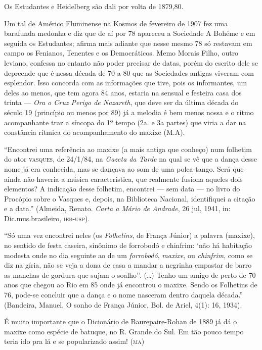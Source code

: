 Os Estudantes e Heidelberg são dali por volta de 1879,80.

Um tal de Américo Fluminense na Kosmos de fevereiro de 1907 fez uma
barafunda medonha e diz que de aí por 78 apareceu a Sociedade A Bohéme e
em seguida os Estudantes; afirma mais adiante que nesse mesmo 78 só
restavam em campo os Fenianos, Tenentes e os Democráticos. Memo Morais
Filho, outro leviano, confessa no entanto não poder precisar de datas,
porém do escrito dele se depreende que é nessa década de 70 a 80 que as
Sociedades antigas viveram com esplendor. Isso concorda com as
informações que tive, pois os informantes, um deles ao menos, que tem
agora 84 anos, estaria na sensual e festeira casa dos trinta --- \emph{Ora
o Cruz Perigo de Nazareth}, que deve ser da última década do século 19
(princípio ou menos por 89) já a melodia é bem menos nossa e o ritmo
acompanhante traz a síncopa do 1º tempo (2a. e 3a partes) que viria a
dar na constância rítmica do acompanhamento do maxixe (M.A).

``Encontrei uma referência ao maxixe (a mais antiga que conheço) num
folhetim do ator \textsc{vasques}, de 24/1/84, na \emph{Gazeta da Tarde} na qual
se vê que a dança desse nome já era conhecida, mas se dançava ao som de
uma polca-tango. Será que ainda não haveria a música característica, que
realmente fusiona aqueles dois elementos? A indicação desse folhetim,
encontrei --- sem data --- no livro do Procópio sobre o Vasques e, depois,
na Biblioteca Nacional, identifiquei a citação e a data.'' (Almeida,
Renato. \emph{Carta a Mário de Andrade}, 26 jul, 1941, in:
Dic.mus.brasileiro, \textsc{ieb-usp}).

``Só uma vez encontrei neles (os \emph{Folhetins}, de França Júnior) a
palavra (maxixe), no sentido de festa caseira, sinônimo de forrobodó e
chinfrim: `não há habitação modesta onde no dia seguinte ao de um
\emph{forrobodó}, \emph{maxixe}, ou \emph{chinfrim}, como se diz na
gíria, não se veja a dona de casa a mandar a negrinha empastar de barro
as manchas de gordura que sujam o soalho''. (\ldots{}) Tenho um amigo de perto
de 70 anos que chegou ao Rio em 85 onde já encontrou o maxixe. Sendo os
Folhetins de 76, pode-se concluir que a dança e o nome nasceram dentro
daquela década.'' (Bandeira, Manuel. O sonho de França Júnior, Bol. de
Ariel, 4(1): 16, 1934).

É muito importante que o Dicionário de Baurepaire-Rohan de 1889 já dá o
maxixe como espécie de batuque, no R. Grande do Sul. Em tão pouco tempo
teria ido pra lá e se popularizado assim! (\textsc{ma})

